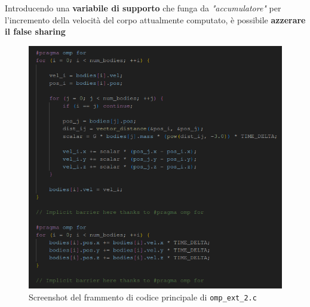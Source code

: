 \documentclass[12pt]{report}
\begin{document}
    Introducendo una \textbf{variabile di supporto} che funga da \textit{"accumulatore"} per l'incremento della velocità del corpo attualmente computato, è possibile \textbf{azzerare il false sharing}
    
    \begin{figure}[H]
        \centering
        \includegraphics[width=\textwidth]{images/omp_ext_2.png}
        \caption{Screenshot del frammento di codice principale di \texttt{omp\_ext\_2.c}}
        \label{fig:omp_ext_2}
    \end{figure}
    
\end{document}
